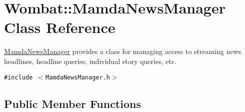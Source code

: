 \hypertarget{classWombat_1_1MamdaNewsManager}{
\section{Wombat::Mamda\-News\-Manager Class Reference}
\label{classWombat_1_1MamdaNewsManager}
}
\hyperlink{classWombat_1_1MamdaNewsManager}{Mamda\-News\-Manager} provides a class for managing access to streaming news headlines, headline queries, individual story queries, etc.  


{\tt \#include $<$Mamda\-News\-Manager.h$>$}

\subsection*{Public Member Functions}
